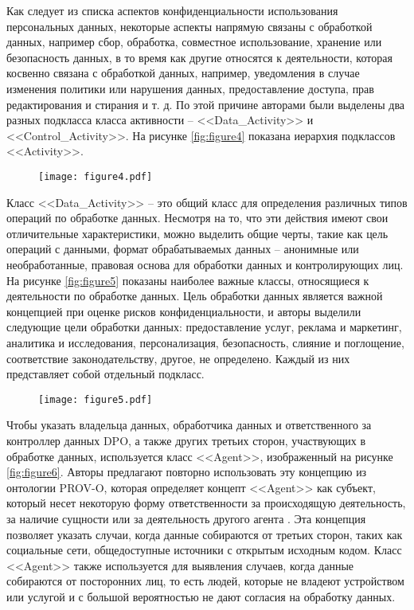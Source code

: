 \documentclass[../main]{subfiles}
\begin{document}
Как следует из списка аспектов конфиденциальности использования персональных данных, некоторые аспекты напрямую связаны с обработкой данных, например сбор, обработка, совместное использование, хранение или безопасность данных, в то время как другие относятся к деятельности, которая косвенно связана с обработкой данных, например, уведомления в случае изменения политики или нарушения данных, предоставление доступа, прав редактирования и стирания и т. д. По этой причине авторами были выделены два разных подкласса класса активности -- <<Data\_Activity>> и <<Control\_Activity>>. На рисунке \ref{fig:figure4} показана иерархия подклассов <<Activity>>. 

\begin{figure}[H]
    \centering
    {\texttt{[image: figure4.pdf]}}
    \vspace{-\baselineskip}
\end{figure}

Класс <<Data\_Activity>> -- это общий класс для определения различных типов операций по обработке данных. Несмотря на то, что эти действия имеют свои отличительные характеристики, можно выделить общие черты, такие как цель операций с данными, формат обрабатываемых данных -- анонимные или необработанные, правовая основа для обработки данных и контролирующих лиц. На рисунке \ref{fig:figure5} показаны наиболее важные классы, относящиеся к деятельности по обработке данных. Цель обработки данных является важной концепцией при оценке рисков конфиденциальности, и авторы выделили следующие цели обработки данных: предоставление услуг, реклама и маркетинг, аналитика и исследования, персонализация, безопасность, слияние и поглощение, соответствие законодательству, другое, не определено. Каждый из них представляет собой отдельный подкласс.

\begin{figure}[H]
    \centering
    {\texttt{[image: figure5.pdf]}}
    \vspace{-\baselineskip}
\end{figure}

Чтобы указать владельца данных, обработчика данных и ответственного за контроллер данных DPO, а также других третьих сторон, участвующих в обработке данных, используется класс <<Agent>>, изображенный на рисунке \ref{fig:figure6}. Авторы предлагают повторно использовать эту концепцию из онтологии PROV-O, которая определяет концепт <<Agent>> как субъект, который несет некоторую форму ответственности за происходящую деятельность, за наличие сущности или за деятельность другого агента \cite{MDPI22}. Эта концепция позволяет указать случаи, когда данные собираются от третьих сторон, таких как социальные сети, общедоступные источники с открытым исходным кодом. Класс <<Agent>> также используется для выявления случаев, когда данные собираются от посторонних лиц, то есть людей, которые не владеют устройством или услугой и с большой вероятностью не дают согласия на обработку данных. 
\end{document}
